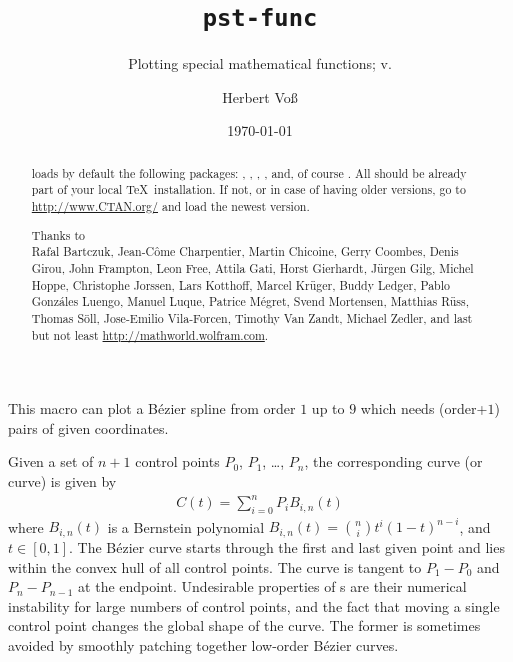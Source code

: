 \documentclass[fontsize=11pt,english,BCOR=10mm,DIV=12,bibliography=totoc,parskip=false,headings=small,
    headinclude=false,footinclude=false,oneside]{pst-doc}
\let\pstFuncFV\fileversion
\begin{document}
\title{\texttt{pst-func}}
\subtitle{Plotting special mathematical functions; v.\pstFuncFV}
\author{Herbert Vo\ss}
\docauthor{}
\date{\today}
\settitle

\tableofcontents
{}


\clearpage

\begin{abstract}
\noindent
{} loads by default the following packages: , 
, , , and, of course .
All should be already part of your local \TeX\ installation. If not, or in case
of having older versions, go to \url{http://www.CTAN.org/} and load the newest version.

\vfill\noindent
{\raggedright
Thanks to \\
    Rafal Bartczuk,
    Jean-C\^ome Charpentier,
    Martin Chicoine, 
    Gerry Coombes, 
    Denis Girou,
    John Frampton, 
    Leon Free,
    Attila Gati, 
    Horst Gierhardt,  
    Jürgen Gilg,
    Michel Hoppe,
    Christophe Jorssen,
    Lars Kotthoff,
    Marcel Krüger,
    Buddy Ledger,
    Pablo Gonzáles Luengo,
    Manuel Luque,
    Patrice Mégret,
    Svend Mortensen,
    Matthias Rüss,
    Thomas Söll,
    Jose-Emilio Vila-Forcen,
    Timothy Van Zandt, 
    Michael Zedler,
and last but not least
    \url{http://mathworld.wolfram.com}.\par}
\end{abstract}



\section{}
This macro can plot a B\'ezier spline from order $1$ up to $9$ which needs
(order+$1$) pairs of given coordinates.

Given a set of $n+1$ control points $P_0$, $P_1$, \ldots, $P_n$,
the corresponding  curve (or  curve) is given by 
%
\begin{align}
C(t)=\sum_{i=0}^n P_i B_{i,n}(t)
\end{align}
%
where $B_{i,n}(t)$ is a Bernstein polynomial $B_{i,n}(t)=\binom{n}{i}t^i(1-t)^{n-i}$,
and $t \in [0,1]$. 
The Bézier curve starts through the first and last given point and 
lies within the convex hull of all control points. The curve is tangent 
to $P_1-P_0$ and $P_n-P_{n-1}$ at the endpoint.
Undesirable properties of s are their numerical instability for 
large numbers of control points, and the fact that moving a single control 
point changes the global shape of the curve. The former is sometimes avoided 
by smoothly patching together low-order Bézier curves. 
\end{document}

